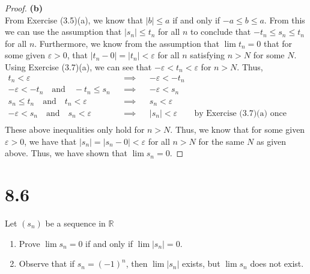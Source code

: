 \documentclass[10pt,a4paper]{article}
\theoremstyle{definition}
\begin{document}
\begin{proof}{\textbf{(b)}}
\\From Exercise (3.5)(a), we know that $|b| \leq a$ if and only if $-a \leq b \leq a$. From this we can use the assumption that $|s_n| \leq t_n$ for all $n$ to conclude that $-t_n \leq s_n \leq t_n$ for all $n$. Furthermore, we know from the assumption that $\lim t_n = 0$ that for some given $\varepsilon > 0$, that $|t_n - 0| = |t_n| < \varepsilon$ for all $n$ satisfying $n > N$ for some $N$. Using Exercise (3.7)(a), we can see that $-\varepsilon < t_n < \varepsilon$ for $n > N$. Thus,
\begin{align*}
t_n < \varepsilon && \implies && -\varepsilon < -t_n\\
-\varepsilon < -t_n \quad \text{and} \quad -t_n \leq s_n && \implies && -\varepsilon < s_n\\
s_n \leq t_n \quad \text{and} \quad t_n < \varepsilon && \implies && s_n < \varepsilon\\
-\varepsilon < s_n \quad \text{and} \quad s_n < \varepsilon && \implies && |s_n| < \varepsilon &\text{ by Exercise (3.7)(a) once again}\\
\end{align*}
These above inequalities only hold for $n > N$. Thus, we know that for some given $\varepsilon > 0$, we have that $|s_n| = |s_n - 0| < \varepsilon$ for all $n > N$ for the same $N$ as given above. Thus, we have shown that $\lim s_n = 0$.
\end{proof}

\section*{8.6}
Let $(s_n)$ be a sequence in $\mathbb{R}$
\begin{enumerate}[label = (\alph*)]
\item Prove $\lim s_n = 0$ if and only if $\lim |s_n| = 0$.
\item Observe that if $s_n = (-1)^n$, then $\lim |s_n|$ exists, but $\lim s_n$ does not exist. 
\end{enumerate}
\end{document}
